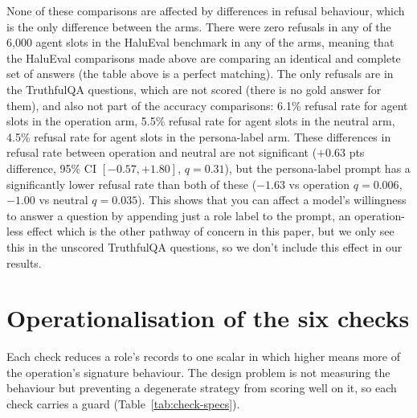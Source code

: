 None of these comparisons are affected by differences in refusal behaviour, which is the only
difference between the arms. There were zero refusals in any of the 6,000 agent slots in the HaluEval
benchmark in any of the arms, meaning that the HaluEval comparisons made above are comparing an
identical and complete set of answers (the table above is a perfect matching). The only refusals are
in the TruthfulQA questions, which are not scored (there is no gold answer for them), and also not
part of the accuracy comparisons: 6.1\% refusal rate for agent slots in the operation arm, 5.5\%
refusal rate for agent slots in the neutral arm, 4.5\% refusal rate for agent slots in the
persona-label arm. These differences in refusal rate between operation and neutral are not
significant ($+0.63$ pts difference, 95\% CI $[-0.57, +1.80]$, $q = 0.31$), but the persona-label
prompt has a significantly lower refusal rate than both of these ($-1.63$ vs operation $q = 0.006$,
$-1.00$ vs neutral $q = 0.035$). This shows that you can affect a model's willingness to answer a
question by appending just a role label to the prompt, an operation-less effect which is the other
pathway of concern in this paper, but we only see this in the unscored TruthfulQA questions, so we
don't include this effect in our results.

\section{Operationalisation of the six checks}
\label{app:checks}

Each check reduces a role's records to one scalar in which higher means more of the operation's
signature behaviour. The design problem is not measuring the behaviour but preventing a degenerate
strategy from scoring well on it, so each check carries a guard (Table~\ref{tab:check-specs}).

